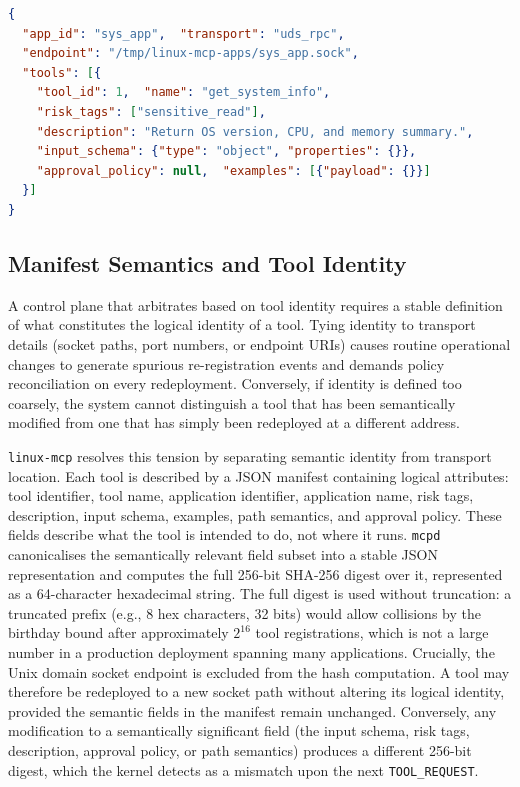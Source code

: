 \noindent\begin{minipage}{\linewidth}
\begin{lstlisting}[style=codestyle, language=json, caption={Representative tool manifest (JSON). The \texttt{endpoint} field is excluded from the semantic hash; all other fields shown here are included.}]
{
  "app_id": "sys_app",  "transport": "uds_rpc",
  "endpoint": "/tmp/linux-mcp-apps/sys_app.sock",
  "tools": [{
    "tool_id": 1,  "name": "get_system_info",
    "risk_tags": ["sensitive_read"],
    "description": "Return OS version, CPU, and memory summary.",
    "input_schema": {"type": "object", "properties": {}},
    "approval_policy": null,  "examples": [{"payload": {}}]
  }]
}
\end{lstlisting}
\end{minipage}


\subsection{Manifest Semantics and Tool Identity}

A control plane that arbitrates based on tool identity requires a stable definition of what constitutes the logical identity of a tool.
Tying identity to transport details (socket paths, port numbers, or endpoint URIs) causes routine operational changes to generate spurious re-registration events and demands policy reconciliation on every redeployment.
Conversely, if identity is defined too coarsely, the system cannot distinguish a tool that has been semantically modified from one that has simply been redeployed at a different address.

\texttt{linux-mcp} resolves this tension by separating semantic identity from transport location.
Each tool is described by a JSON manifest containing logical attributes: tool identifier, tool name, application identifier, application name, risk tags, description, input schema, examples, path semantics, and approval policy.
These fields describe what the tool is intended to do, not where it runs.
\texttt{mcpd} canonicalises the semantically relevant field subset into a stable JSON representation and computes the full 256-bit SHA-256 digest over it, represented as a 64-character hexadecimal string.
The full digest is used without truncation: a truncated prefix (e.g., 8 hex characters, 32 bits) would allow collisions by the birthday bound after approximately $2^{16}$ tool registrations, which is not a large number in a production deployment spanning many applications.
Crucially, the Unix domain socket endpoint is excluded from the hash computation.
A tool may therefore be redeployed to a new socket path without altering its logical identity, provided the semantic fields in the manifest remain unchanged.
Conversely, any modification to a semantically significant field (the input schema, risk tags, description, approval policy, or path semantics) produces a different 256-bit digest, which the kernel detects as a mismatch upon the next \texttt{TOOL\_REQUEST}.

